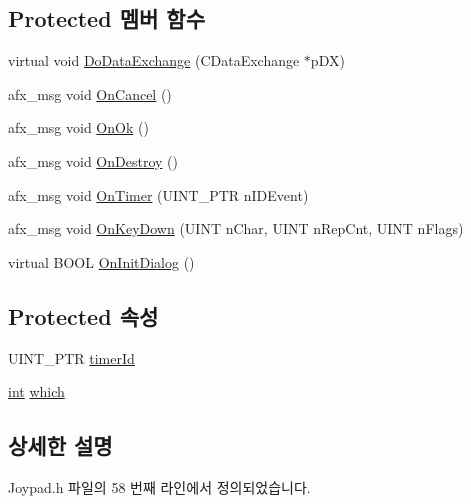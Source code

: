 \subsection*{Protected 멤버 함수}
\begin{DoxyCompactItemize}
\item 
virtual void \mbox{\hyperlink{class_joypad_config_a9b0e5a934f13fb9009211c082933eb50}{Do\+Data\+Exchange}} (C\+Data\+Exchange $\ast$p\+DX)
\item 
afx\+\_\+msg void \mbox{\hyperlink{class_joypad_config_a1ff1e82beb3c0cb4363165277fabc796}{On\+Cancel}} ()
\item 
afx\+\_\+msg void \mbox{\hyperlink{class_joypad_config_a80b628b0368a606e47d6ecd2d1e76624}{On\+Ok}} ()
\item 
afx\+\_\+msg void \mbox{\hyperlink{class_joypad_config_a466cce6bccb02ce7a31dd5697668c904}{On\+Destroy}} ()
\item 
afx\+\_\+msg void \mbox{\hyperlink{class_joypad_config_af55cd03e7ed293d17d338858285a8087}{On\+Timer}} (U\+I\+N\+T\+\_\+\+P\+TR n\+I\+D\+Event)
\item 
afx\+\_\+msg void \mbox{\hyperlink{class_joypad_config_a17d863f586b81ee50fa579ec637d834c}{On\+Key\+Down}} (U\+I\+NT n\+Char, U\+I\+NT n\+Rep\+Cnt, U\+I\+NT n\+Flags)
\item 
virtual B\+O\+OL \mbox{\hyperlink{class_joypad_config_afc8d09942cc5d7ff9e69e27a98ff2430}{On\+Init\+Dialog}} ()
\end{DoxyCompactItemize}
\subsection*{Protected 속성}
\begin{DoxyCompactItemize}
\item 
U\+I\+N\+T\+\_\+\+P\+TR \mbox{\hyperlink{class_joypad_config_ae2eb21b8f63e8cf86a5461e78901c3f5}{timer\+Id}}
\item 
\mbox{\hyperlink{_util_8cpp_a0ef32aa8672df19503a49fab2d0c8071}{int}} \mbox{\hyperlink{class_joypad_config_ad71f1ad36754d788de00eb4bb5630dda}{which}}
\end{DoxyCompactItemize}


\subsection{상세한 설명}


Joypad.\+h 파일의 58 번째 라인에서 정의되었습니다.




